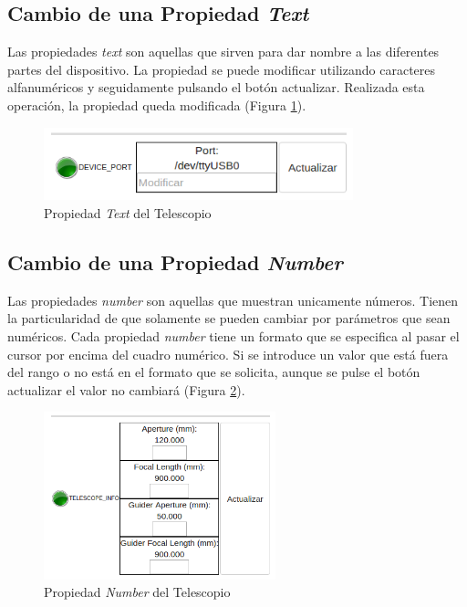 \subsection{Cambio de una Propiedad \textit{Text}}
Las propiedades \textit{text} son aquellas que sirven para dar nombre a las diferentes partes del dispositivo.
La propiedad se puede modificar utilizando caracteres alfanuméricos y seguidamente pulsando el botón actualizar. Realizada esta operación, la propiedad queda modificada (Figura \ref{fig:propiedadText}).
\begin{figure}[htb]
\centering
\includegraphics[width=0.8\textwidth]{./imagenes/capturaText}
\caption{Propiedad \textit{Text} del Telescopio} \label{fig:propiedadText}
\end{figure}

\subsection{Cambio de una Propiedad \textit{Number}}
Las propiedades \textit{number} son aquellas que muestran unicamente números. Tienen la particularidad de que solamente se pueden cambiar por parámetros que sean numéricos. Cada propiedad \textit{number} tiene un formato que se especifica al pasar el cursor por encima del cuadro numérico. Si se introduce un valor que está fuera del rango o no está en el formato que se solicita, aunque se pulse el botón actualizar el valor no cambiará (Figura \ref{fig:propiedadNumber}).
\begin{figure}[htb]
\centering
\includegraphics[width=0.6\textwidth]{./imagenes/capturaNumber}
\caption{Propiedad \textit{Number} del Telescopio} \label{fig:propiedadNumber}
\end{figure}

